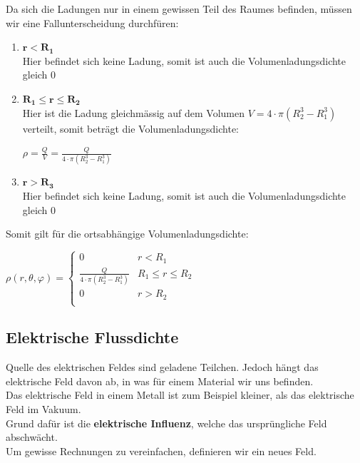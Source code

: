 \beginbsp
Da sich die Ladungen nur in einem gewissen Teil des Raumes befinden, müssen wir eine Fallunterscheidung durchfüren:
\begin{enumerate}
	\item $\mathbf{r < R_1}$ \\
	Hier befindet sich keine Ladung, somit ist auch die Volumenladungsdichte gleich 0
		\item $\mathbf{R_1 \leq r \leq R_2}$ \\
		Hier ist die Ladung gleichmässig auf dem Volumen $V = 4\cdot \pi (R_2^3 - R_1^3)$ verteilt, somit beträgt die Volumenladungsdichte:
		\begin{center}
			$\displaystyle \rho = \frac{Q}{V} = \frac{Q}{4 \cdot \pi (R_2^3 - R_1^3) }$
		\end{center}
		\item $\mathbf{r > R_3}$ \\
		Hier befindet sich keine Ladung, somit ist auch die Volumenladungsdichte gleich 0
\end{enumerate}

Somit gilt für die ortsabhängige Volumenladungsdichte:
\begin{center}
	$\displaystyle	\rho(r,\theta,\varphi) =
		\begin{cases}
			0                                       & r < R_1 \\
		 \frac{Q}{4 \cdot \pi (R_2^3 - R_1^3)} & R_1 \leq r \leq R_2\\
				0                                       & r > R_2 \\
		\end{cases}$
\end{center}

\iend


\newpage

\subsection{Elektrische Flussdichte}
Quelle des elektrischen Feldes sind geladene Teilchen. Jedoch hängt das elektrische Feld davon ab, in was für einem Material wir uns befinden. \\
Das elektrische Feld in einem Metall ist zum Beispiel kleiner, als das elektrische Feld im Vakuum. \\
Grund dafür ist die \textbf{elektrische Influenz}, welche das ursprüngliche Feld abschwächt. \\
Um gewisse Rechnungen zu vereinfachen, definieren wir ein neues Feld.

